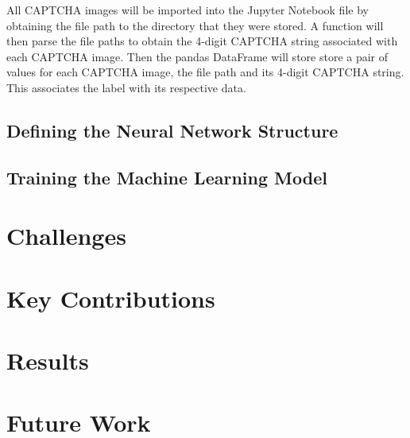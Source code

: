 \documentclass[11pt,conference]{IEEEtran}
\begin{document}
All CAPTCHA images will be imported into the Jupyter Notebook file by obtaining
the file path to the directory that they were stored. A function will then
parse the file paths to obtain the 4-digit CAPTCHA string associated with each
CAPTCHA image. Then the pandas DataFrame will store store a pair of values for
each CAPTCHA image, the file path and its 4-digit CAPTCHA string. This
associates the label with its respective data.


\subsection{Defining the Neural Network Structure}

\subsection{Training the Machine Learning Model}

\section{Challenges}

\section{Key Contributions}

\section{Results}


\section{Future Work}
\end{document}
